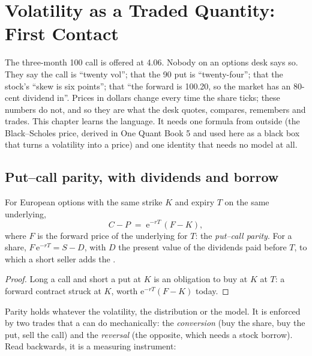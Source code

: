 \chapter{Volatility as a Traded Quantity: First Contact}\label{ch:m1:volatility-first-contact}

The three-month 100 call is offered at 4.06. Nobody on an options desk says
so. They say the call is ``twenty vol''; that the 90 put is ``twenty-four'';
that the stock's ``skew is six points''; that ``the forward is 100.20, so the
market has an 80-cent dividend in''. Prices in dollars change every time the
share ticks; these numbers do not, and so they are what the desk quotes,
compares, remembers and trades. This chapter learns the language. It needs
one formula from outside (the Black--Scholes price, derived in One Quant
Book 5 and used here as a black box that turns a volatility into a price)
and one identity that needs no model at all.

\section{Put--call parity, with dividends and borrow}

\begin{proposition}\label{prop:m1:volatility-first-contact:parity}
For European options with the same strike $K$ and expiry $T$ on the same
underlying,
\[
C - P \;=\; \mathrm{e}^{-rT}\,(F - K),
\]
where $F$ is the forward price of the underlying for $T$: the \emph{put--call
parity}. For a share, $F\,\mathrm{e}^{-rT} = S - D$,
with $D$ the present value of the dividends paid before $T$, to which a
short seller adds the .
\end{proposition}
\begin{proof}
Long a call and short a put at $K$ is an obligation to buy at $K$ at $T$: a
forward contract struck at $K$, worth $\mathrm{e}^{-rT}(F-K)$ today.
\end{proof}

Parity holds whatever the volatility, the distribution or the model. It is
enforced by two trades that a  can do mechanically: the
\emph{conversion} (buy the share, buy the put, sell the call) and the
\emph{reversal} (the opposite, which needs a stock borrow). Read backwards,
it is a measuring instrument:

